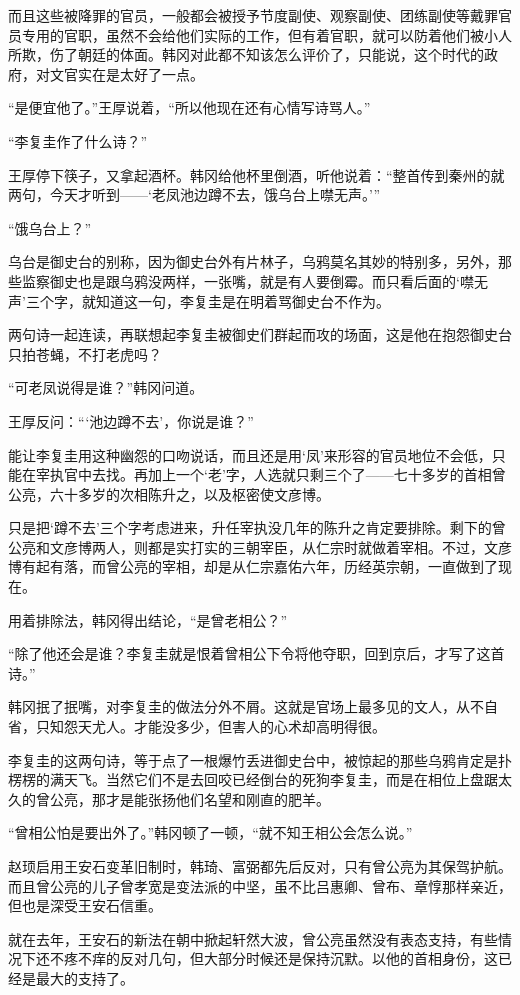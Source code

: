 而且这些被降罪的官员，一般都会被授予节度副使、观察副使、团练副使等戴罪官员专用的官职，虽然不会给他们实际的工作，但有着官职，就可以防着他们被小人所欺，伤了朝廷的体面。韩冈对此都不知该怎么评价了，只能说，这个时代的政府，对文官实在是太好了一点。

“是便宜他了。”王厚说着，“所以他现在还有心情写诗骂人。”

“李复圭作了什么诗？”

王厚停下筷子，又拿起酒杯。韩冈给他杯里倒酒，听他说着：“整首传到秦州的就两句，今天才听到——‘老凤池边蹲不去，饿乌台上噤无声。’”

“饿乌台上？”

乌台是御史台的别称，因为御史台外有片林子，乌鸦莫名其妙的特别多，另外，那些监察御史也是跟乌鸦没两样，一张嘴，就是有人要倒霉。而只看后面的‘噤无声’三个字，就知道这一句，李复圭是在明着骂御史台不作为。

两句诗一起连读，再联想起李复圭被御史们群起而攻的场面，这是他在抱怨御史台只拍苍蝇，不打老虎吗？

“可老凤说得是谁？”韩冈问道。

王厚反问：“‘池边蹲不去’，你说是谁？”

能让李复圭用这种幽怨的口吻说话，而且还是用‘凤’来形容的官员地位不会低，只能在宰执官中去找。再加上一个‘老’字，人选就只剩三个了——七十多岁的首相曾公亮，六十多岁的次相陈升之，以及枢密使文彦博。

只是把‘蹲不去’三个字考虑进来，升任宰执没几年的陈升之肯定要排除。剩下的曾公亮和文彦博两人，则都是实打实的三朝宰臣，从仁宗时就做着宰相。不过，文彦博有起有落，而曾公亮的宰相，却是从仁宗嘉佑六年，历经英宗朝，一直做到了现在。

用着排除法，韩冈得出结论，“是曾老相公？”

“除了他还会是谁？李复圭就是恨着曾相公下令将他夺职，回到京后，才写了这首诗。”

韩冈抿了抿嘴，对李复圭的做法分外不屑。这就是官场上最多见的文人，从不自省，只知怨天尤人。才能没多少，但害人的心术却高明得很。

李复圭的这两句诗，等于点了一根爆竹丢进御史台中，被惊起的那些乌鸦肯定是扑楞楞的满天飞。当然它们不是去回咬已经倒台的死狗李复圭，而是在相位上盘踞太久的曾公亮，那才是能张扬他们名望和刚直的肥羊。

“曾相公怕是要出外了。”韩冈顿了一顿，“就不知王相公会怎么说。”

赵顼启用王安石变革旧制时，韩琦、富弼都先后反对，只有曾公亮为其保驾护航。而且曾公亮的儿子曾孝宽是变法派的中坚，虽不比吕惠卿、曾布、章惇那样亲近，但也是深受王安石信重。

就在去年，王安石的新法在朝中掀起轩然大波，曾公亮虽然没有表态支持，有些情况下还不疼不痒的反对几句，但大部分时候还是保持沉默。以他的首相身份，这已经是最大的支持了。

